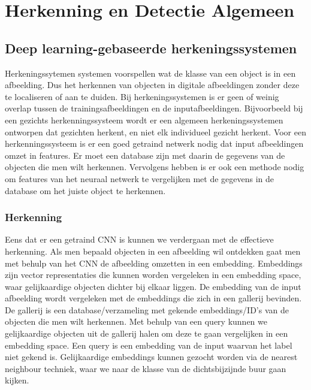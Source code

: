 \chapter{Herkenning en Detectie Algemeen}

\section{Deep learning-gebaseerde herkeningssystemen}
Herkeningssytemen systemen voorspellen wat de klasse van een object is in een afbeelding. 
Dus het herkennen van objecten in digitale afbeeldingen zonder deze te localiseren of aan te duiden. 
Bij herkeningssystemen is er geen of weinig overlap tussen de trainingsafbeeldingen en de inputafbeeldingen.
Bijvoorbeeld bij een gezichts herkenningssysteem wordt er een algemeen herkeningssystemen ontworpen dat gezichten herkent, en niet elk individueel gezicht herkent.
Voor een herkenningssysteem is er een goed getraind netwerk nodig dat input afbeeldingen omzet in features. 
Er moet een database zijn met daarin de gegevens van de objecten die men wilt herkennen. 
Vervolgens hebben is er ook een methode nodig om features van het neuraal netwerk te vergelijken met de gegevens in de database om het juiste object te herkennen.

\subsection{Herkenning}
Eens dat er een getraind CNN is kunnen we verdergaan met de effectieve herkenning. 
Als men bepaald objecten in een afbeelding wil ontdekken gaat men met behulp van het CNN de afbeelding omzetten in een embedding. 
Embeddings zijn vector representaties die kunnen worden vergeleken in een embedding space, waar gelijkaardige objecten dichter bij elkaar liggen. De embedding van de input afbeelding wordt vergeleken met de embeddings die zich in een gallerij bevinden. 
De gallerij is een database/verzameling met gekende embeddings/ID's van de objecten die men wilt herkennen.
Met behulp van een query kunnen we gelijkaardige objecten uit de gallerij halen om deze te gaan vergelijken in een embedding space. 
Een query is een embedding van de input waarvan het label niet gekend is.
Gelijkaardige embeddings kunnen gezocht worden via de nearest neighbour techniek, waar we naar de klasse van de dichtsbijzijnde buur gaan kijken.

